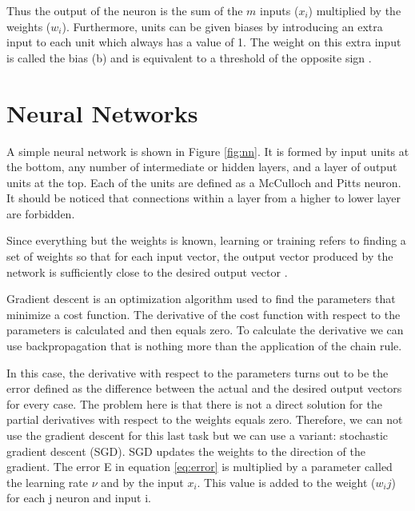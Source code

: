 Thus the output of the neuron is the sum of the $m$ inputs ($x_i$) multiplied by the weights ($w_i$). Furthermore, units can be given biases by introducing an extra input to each unit which always has a value of 1. The weight on this extra input is called the bias (b) and is equivalent to a threshold of the opposite sign \cite{polk2002cognitive}. 


\section{Neural Networks}

A simple neural network is shown in Figure \ref{fig:nn}. It is formed by input units at the bottom, any number of intermediate or hidden layers, and a layer of output units at the top. Each of the units are  defined as a McCulloch and Pitts neuron. It should be noticed that connections within a layer from a higher to lower layer are forbidden. 

Since everything but the weights is known, learning or training refers to finding a set of weights so that for each input vector, the output vector produced by the network is sufficiently close to the desired output vector \cite{polk2002cognitive}. 

Gradient descent is an optimization algorithm used to find the parameters  that minimize a cost function. The derivative of the cost function with respect to the parameters is calculated and then equals zero. To calculate the derivative we can use backpropagation that is nothing more than the application of the chain rule.

In this case, the derivative with respect to the parameters turns out to be the error defined as the difference between the actual and the desired output vectors for every case. The problem here is that there is not a direct solution for the partial derivatives with respect to the weights equals zero. Therefore, we can not use the gradient descent for this last task but we can use a variant: stochastic gradient descent (SGD).
SGD updates the weights to the direction of the gradient. The error E in equation \ref{eq:error} is multiplied by a parameter called the learning rate $\nu$ and by the input $x_i$. This value is added to the weight ($w_ij$) for each j neuron and input i.

